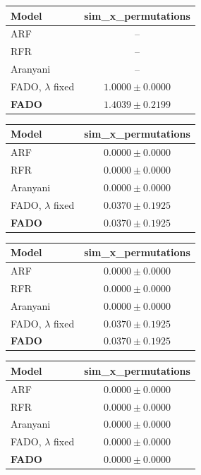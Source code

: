 \begin{tabular}{lc}
\toprule
\textbf{Model} & sim\_x\_permutations \\
\midrule
ARF & -- \\
RFR & -- \\
Aranyani & -- \\
FADO, $\lambda$ fixed & $1.0000 \pm 0.0000$ \\
\textbf{FADO} & $1.4039 \pm 0.2199$ \\
\bottomrule
\end{tabular}

\begin{tabular}{lc}
\toprule
\textbf{Model} & sim\_x\_permutations \\
\midrule
ARF & $0.0000 \pm 0.0000$ \\
RFR & $0.0000 \pm 0.0000$ \\
Aranyani & $0.0000 \pm 0.0000$ \\
FADO, $\lambda$ fixed & $0.0370 \pm 0.1925$ \\
\textbf{FADO} & $0.0370 \pm 0.1925$ \\
\bottomrule
\end{tabular}

\begin{tabular}{lc}
\toprule
\textbf{Model} & sim\_x\_permutations \\
\midrule
ARF & $0.0000 \pm 0.0000$ \\
RFR & $0.0000 \pm 0.0000$ \\
Aranyani & $0.0000 \pm 0.0000$ \\
FADO, $\lambda$ fixed & $0.0370 \pm 0.1925$ \\
\textbf{FADO} & $0.0370 \pm 0.1925$ \\
\bottomrule
\end{tabular}

\begin{tabular}{lc}
\toprule
\textbf{Model} & sim\_x\_permutations \\
\midrule
ARF & $0.0000 \pm 0.0000$ \\
RFR & $0.0000 \pm 0.0000$ \\
Aranyani & $0.0000 \pm 0.0000$ \\
FADO, $\lambda$ fixed & $0.0000 \pm 0.0000$ \\
\textbf{FADO} & $0.0000 \pm 0.0000$ \\
\bottomrule
\end{tabular}

